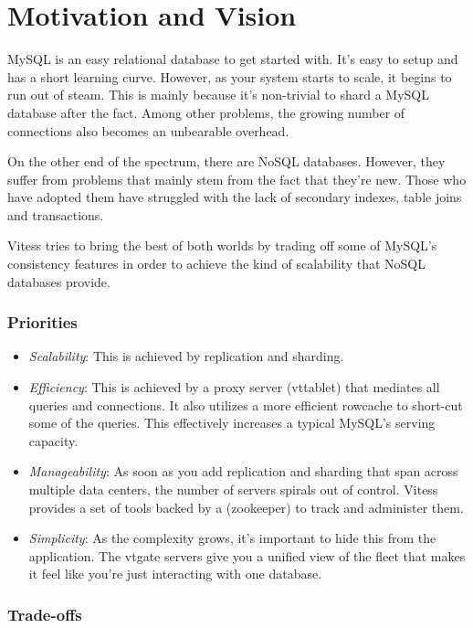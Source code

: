 \section{Motivation and Vision}\label{Motivation-and-Vision}

MySQL is an easy relational database to get started with.
It's easy to setup and has a short learning curve.
However, as your system starts to scale, it begins to run out of steam.
This is mainly because it's non-trivial to shard a MySQL database after the fact.
Among other problems, the growing number of connections also becomes an
unbearable overhead.

On the other end of the spectrum, there are NoSQL databases.
However, they suffer from problems that mainly stem from the fact that they're new.
Those who have adopted them have struggled with the lack of secondary indexes,
table joins and transactions.

Vitess tries to bring the best of both worlds by trading off
some of MySQL's consistency features in order to achieve the
kind of scalability that NoSQL databases provide.

\subsubsection{Priorities}\hypertarget{priorities}{}\label{priorities}

\begin{itemize}
\item \emph{Scalability}: This is achieved by replication and sharding.
\item \emph{Efficiency}: This is achieved by a proxy server (vttablet) that mediates
all queries and connections.
It also utilizes a more efficient rowcache to short-cut some of the queries.
This effectively increases a typical MySQL's serving capacity.
\item \emph{Manageability}: As soon as you add replication and sharding that span
across multiple data centers, the number of servers spirals out of control.
Vitess provides a set of tools backed by a  (zookeeper) to
track and administer them.
\item \emph{Simplicity}: As the complexity grows, it's important to hide this
from the application.
The vtgate servers give you a unified view of the fleet that makes
it feel like you're just interacting with one database.
\end{itemize}

\subsubsection{Trade-offs}\hypertarget{trade-offs}{}\label{trade-offs}

